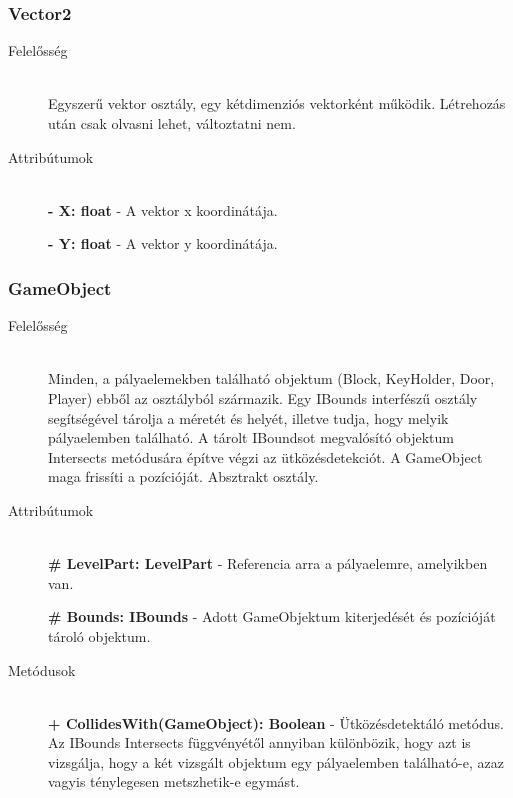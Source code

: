 \subsubsection{Vector2}
	\begin{description}
	\item[Felelősség] \hfill \\
	Egyszerű vektor osztály, egy kétdimenziós vektorként működik. Létrehozás után csak olvasni lehet, változtatni nem.
	\item[Attribútumok] \hfill \\
	\textbf{- X: float} - A vektor x koordinátája.
	
	\textbf{- Y: float} - A vektor y koordinátája.

	\end{description}
	
\subsubsection{GameObject}
	\begin{description}
		\item[Felelősség] \hfill \\
		Minden, a pályaelemekben található objektum (Block, KeyHolder, Door, Player) ebből az osztályból származik. Egy IBounds interfészű osztály segítségével tárolja a méretét és helyét, illetve tudja, hogy melyik pályaelemben található. A tárolt IBoundsot megvalósító objektum Intersects metódusára építve végzi az ütközésdetekciót. A GameObject maga frissíti a pozícióját. Absztrakt osztály.
		
		\item[Attribútumok]\hfill \\
		\textbf{\# LevelPart: LevelPart} - Referencia arra a pályaelemre, amelyikben van.
		
		\textbf{\# Bounds: IBounds} - Adott GameObjektum kiterjedését és pozícióját tároló objektum.
		
		\item[Metódusok]\hfill \\
		\textbf{+ CollidesWith(GameObject): Boolean} - Ütközésdetektáló metódus. Az IBounds Intersects függvényétől annyiban különbözik, hogy azt is vizsgálja, hogy a két vizsgált objektum egy pályaelemben található-e, azaz vagyis ténylegesen metszhetik-e egymást.
						
	\end{description}
	
